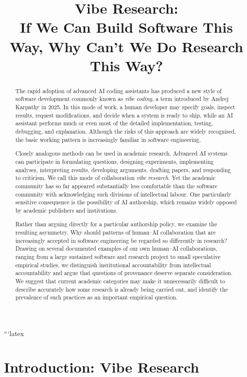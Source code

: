 ```latex
\title{Vibe Research:\\
If We Can Build Software This Way, Why Can't We Do Research This Way?}

\begin{abstract}
The rapid adoption of advanced AI coding assistants has produced a new style of software development commonly known as \emph{vibe coding}, a term introduced by Andrej Karpathy in 2025. In this mode of work, a human developer may specify goals, inspect results, request modifications, and decide when a system is ready to ship, while an AI assistant performs much or even most of the detailed implementation, testing, debugging, and explanation. Although the risks of this approach are widely recognised, the basic working pattern is increasingly familiar in software engineering.

Closely analogous methods can be used in academic research. Advanced AI systems can participate in formulating questions, designing experiments, implementing analyses, interpreting results, developing arguments, drafting papers, and responding to criticism. We call this mode of collaboration \emph{vibe research}. Yet the academic community has so far appeared substantially less comfortable than the software community with acknowledging such divisions of intellectual labour. One particularly sensitive consequence is the possibility of AI authorship, which remains widely opposed by academic publishers and institutions.

Rather than arguing directly for a particular authorship policy, we examine the resulting asymmetry. Why should patterns of human--AI collaboration that are increasingly accepted in software engineering be regarded so differently in research? Drawing on several documented examples of our own human--AI collaborations, ranging from a large sustained software and research project to small speculative empirical studies, we distinguish institutional accountability from intellectual accountability and argue that questions of provenance deserve separate consideration. We suggest that current academic categories may make it unnecessarily difficult to describe accurately how some research is already being carried out, and identify the prevalence of such practices as an important empirical question.
\end{abstract}


\section{Introduction: Vibe Research}

